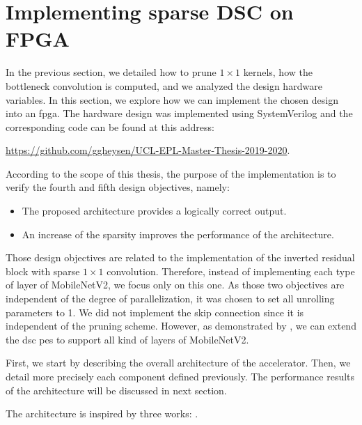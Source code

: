 \section{Implementing sparse DSC on FPGA} \label{sec:implementation}
In the previous section, we detailed how to prune $1 \times 1$ kernels, how the bottleneck convolution is computed, and we analyzed the design hardware variables. In this section, we explore how we can implement the chosen design into an \acrshort{fpga}. The hardware design was implemented using SystemVerilog and the corresponding code can be found at this address: 
%
\begin{center}
    \url{https://github.com/ggheysen/UCL-EPL-Master-Thesis-2019-2020}.
\end{center}
%
According to the scope of this thesis, the purpose of the implementation is to verify the fourth and fifth design objectives, namely:
%
\begin{itemize}
    \item The proposed architecture provides a logically correct output.
    \item An increase of the sparsity improves the performance of the architecture.
\end{itemize}
%
Those design objectives are related to the implementation of the inverted residual block with sparse $1 \times 1$ convolution. Therefore, instead of implementing each type of layer of MobileNetV2, we focus only on this one. As those two objectives are independent of the degree of parallelization, it was chosen to set all unrolling parameters to 1. We did not implement the skip connection since it is independent of the pruning scheme. However, as demonstrated by \textcite{bai_cnn_2018, liu_fpga-based_2019}, we can extend the \acrshort{dsc} \acrshort{pe}s to support all kind of layers of MobileNetV2.

First, we start by describing the overall architecture of the accelerator. Then, we detail more precisely each component defined previously. The performance results of the architecture will be discussed in next section.

The architecture is inspired by three works: \textcite{zhu_efficient_2020, kang_accelerator-aware_2020, bai_cnn_2018}.
%
